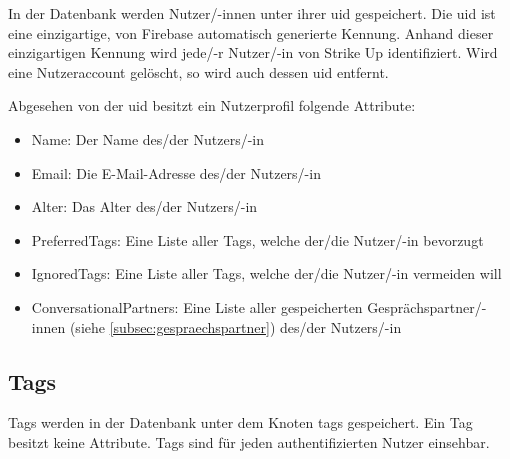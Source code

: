 In der Datenbank werden Nutzer/-innen unter ihrer \gls{uid} gespeichert. Die \gls{uid} ist eine einzigartige, von Firebase automatisch generierte Kennung. Anhand dieser einzigartigen
Kennung wird jede/-r Nutzer/-in von Strike Up identifiziert. Wird eine Nutzeraccount gelöscht, so wird auch dessen \gls{uid} entfernt.

Abgesehen von der \gls{uid} besitzt ein Nutzerprofil folgende Attribute:
\begin{itemize}
    \item Name: Der Name des/der Nutzers/-in
    \item Email: Die E-Mail-Adresse des/der Nutzers/-in
    \item Alter: Das Alter des/der Nutzers/-in
    \item PreferredTags: Eine Liste aller Tags, welche der/die Nutzer/-in bevorzugt
    \item IgnoredTags: Eine Liste aller Tags, welche der/die Nutzer/-in vermeiden will
    \item ConversationalPartners: Eine Liste aller gespeicherten Gesprächspartner/-innen (siehe \ref{subsec:gespraechspartner}) des/der Nutzers/-in
\end{itemize}


\subsection{Tags}
\label{subsec:tags}

Tags werden in der Datenbank unter dem Knoten \glqq{}tags\grqq{} gespeichert. Ein Tag besitzt keine Attribute. Tags sind für jeden authentifizierten Nutzer einsehbar.

